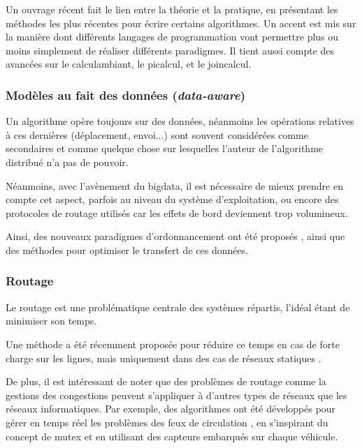 Un ouvrage récent \cite{varela2013programming} fait le lien entre la théorie et la pratique, en présentant les méthodes les plus récentes pour écrire certains algorithmes. Un accent est mis sur la manière dont différents langages de programmation vont permettre plus ou moins simplement de réaliser différents paradigmes. Il tient aussi compte des avancées sur le \gls{calculambiant}, le \gls{picalcul}, et le \gls{joincalcul}.

\subsubsection{Modèles au fait des données (\textit{data-aware})}
Un algorithme opère toujours sur des données, néanmoins les opérations relatives à ces dernières (déplacement, envoi...) sont souvent considérées comme secondaires et comme quelque chose sur lesquelles l'auteur de l'algorithme distribué n'a pas de pouvoir.

Néanmoins, avec l'avènement du \gls{bigdata}, il est nécessaire de mieux prendre en compte cet aspect, parfois au niveau du système d'exploitation, ou encore des protocoles de routage utilisés \cite{baehni2004dependable} car les effets de bord deviennent trop volumineux.

Ainsi, des nouveaux paradigmes d'ordonnancement ont été proposés \cite{yildirim2012data, kosar2009paradigm}, ainsi que des méthodes pour optimiser le transfert de ces données.

\subsubsection{Routage}
Le routage est une problématique centrale des systèmes répartis, l'idéal étant de minimiser son temps.

Une méthode a été récemment proposée pour réduire ce temps en cas de forte charge sur les lignes, mais uniquement dans des cas de réseaux statiques \cite{jeon2014fully}.


De plus, il est intéressant de noter que des problèmes de routage comme la gestions des congestions peuvent s'appliquer à d'autres types de réseaux que les réseaux informatiques. Par exemple, des algorithmes ont été développés pour gérer en temps réel les problèmes des feux de circulation \cite{aoxue2014distributed}, en s'inspirant du concept de \gls{mutex} et en utilisant des capteurs embarqués sur chaque véhicule.

